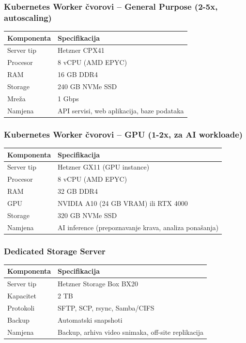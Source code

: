 \documentclass{article}
\begin{document}
\subsubsection{Kubernetes Worker čvorovi -- General Purpose (2-5x, autoscaling)}

\begin{center}
\begin{tabular}{|l|l|}
\hline
\rowcolor{lightgray}
\textbf{Komponenta} & \textbf{Specifikacija} \\
\hline
Server tip & Hetzner CPX41 \\
\hline
Procesor & 8 vCPU (AMD EPYC) \\
\hline
RAM & 16 GB DDR4 \\
\hline
Storage & 240 GB NVMe SSD \\
\hline
Mreža & 1 Gbps \\
\hline
Namjena & API servisi, web aplikacija, baze podataka \\
\hline
\end{tabular}
\end{center}

\subsubsection{Kubernetes Worker čvorovi -- GPU (1-2x, za AI workloade)}

\begin{center}
\begin{tabular}{|l|l|}
\hline
\rowcolor{lightgray}
\textbf{Komponenta} & \textbf{Specifikacija} \\
\hline
Server tip & Hetzner GX11 (GPU instance) \\
\hline
Procesor & 8 vCPU (AMD EPYC) \\
\hline
RAM & 32 GB DDR4 \\
\hline
GPU & NVIDIA A10 (24 GB VRAM) ili RTX 4000 \\
\hline
Storage & 320 GB NVMe SSD \\
\hline
Namjena & AI inference (prepoznavanje krava, analiza ponašanja) \\
\hline
\end{tabular}
\end{center}

\subsubsection{Dedicated Storage Server}

\begin{center}
\begin{tabular}{|l|l|}
\hline
\rowcolor{lightgray}
\textbf{Komponenta} & \textbf{Specifikacija} \\
\hline
Server tip & Hetzner Storage Box BX20 \\
\hline
Kapacitet & 2 TB \\
\hline
Protokoli & SFTP, SCP, rsync, Samba/CIFS \\
\hline
Backup & Automatski snapshoti \\
\hline
Namjena & Backup, arhiva video snimaka, off-site replikacija \\
\hline
\end{tabular}
\end{center}
\end{document}
